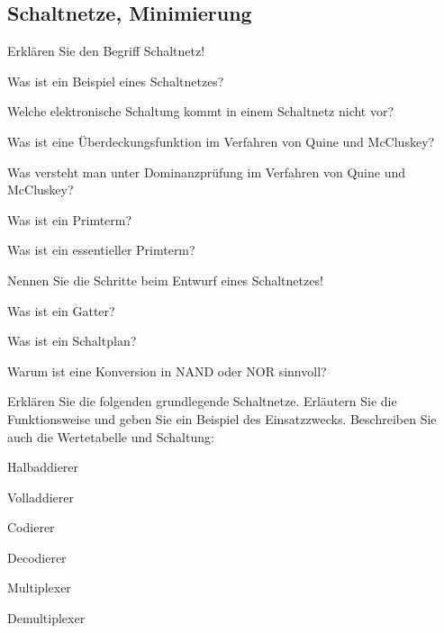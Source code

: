 \documentclass
[
  draft    = true,
  fontsize = 11pt,
  parskip  = half-,
  BCOR     = 0pt,
  DIV      = 11,
  ngerman,
  dvipsnames
]
{scrartcl}
\begin{document}
\subsection*{Schaltnetze, Minimierung}
\begin{mytemize}
  \item Erklären Sie den Begriff Schaltnetz!
        \begin{mytemize}
          \item Was ist ein Beispiel eines Schaltnetzes?
          \item Welche elektronische Schaltung kommt in einem Schaltnetz nicht vor?
        \end{mytemize}
  \item Was ist eine Überdeckungsfunktion im Verfahren von Quine und McCluskey?
  \item Was versteht man unter Dominanzprüfung im Verfahren von Quine und McCluskey?
  \item Was ist ein Primterm?
  \item Was ist ein essentieller Primterm?
  \item Nennen Sie die Schritte beim Entwurf eines Schaltnetzes!
  \item Was ist ein Gatter?
  \item Was ist ein Schaltplan?
  \item Warum ist eine Konversion in NAND oder NOR sinnvoll?
  \item Erklären Sie die folgenden grundlegende Schaltnetze. Erläutern
        Sie die Funktionsweise und geben Sie ein Beispiel des Einsatzzwecks.
        Beschreiben Sie auch die Wertetabelle und Schaltung:
        \begin{mytemize}
          \item Halbaddierer
          \item Volladdierer
          \item Codierer
          \item Decodierer
          \item Multiplexer
          \item Demultiplexer
        \end{mytemize}
\end{mytemize}

\end{document}
